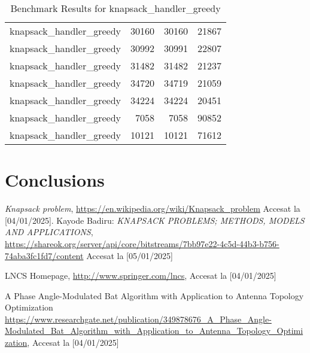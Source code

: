 \documentclass[runningheads]{llncs}
\begin{document}
\begin{table}[h]
\begin{tabular}{@{}lrrr@{}}
        knapsack\_handler\_greedy & 30160 & 30160 & 21867 \\
        knapsack\_handler\_greedy & 30992 & 30991 & 22807 \\
        knapsack\_handler\_greedy & 31482 & 31482 & 21237 \\
        knapsack\_handler\_greedy & 34720 & 34719 & 21059 \\
        knapsack\_handler\_greedy & 34224 & 34224 & 20451 \\
        knapsack\_handler\_greedy & 7058 & 7058 & 90852 \\
        knapsack\_handler\_greedy & 10121 & 10121 & 71612 \\
        \bottomrule
    \end{tabular}
    \caption{Benchmark Results for knapsack\_handler\_greedy}
\end{table}
\clearpage








\section{Conclusions}

%
%
%
% 
% 
%
\begin{thebibliography}{8}
\emph{Knapsack problem}, \url{https://en.wikipedia.org/wiki/Knapsack_problem} Accesat la [04/01/2025].
Kayode Badiru: \emph{KNAPSACK PROBLEMS; METHODS, MODELS AND APPLICATIONS},
\url{https://shareok.org/server/api/core/bitstreams/7bb97e22-4c5d-44b3-b756-74aba3fc1fd7/content} 
Accesat la [05/01/2025]

LNCS Homepage, \url{http://www.springer.com/lncs}, Accesat la [04/01/2025]

A Phase Angle-Modulated Bat Algorithm with Application to Antenna Topology Optimization
\url{https://www.researchgate.net/publication/349878676_A_Phase_Angle-Modulated_Bat_Algorithm_with_Application_to_Antenna_Topology_Optimization}, Accesat la [04/01/2025]

\end{thebibliography}
\end{document}
